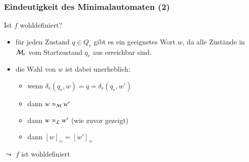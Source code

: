 \documentclass[aspectratio=1610,onlymath]{beamer}
\begin{document}
\begin{frame}[t]\frametitle{Eindeutigkeit des Minimalautomaten (2)}


%
\medskip

Ist $f$ wohldefiniert?\pause
\begin{itemize}
\item für jeden Zustand $q\in Q_r$ gibt es ein geeignetes Wort $w$, da alle Zustände in $\mathcal{M}_r$ vom
Startzustand $q_r$ aus erreichbar sind.\pause
\item die Wahl von $w$ ist dabei unerheblich: 
\begin{itemize}
\item wenn $\delta_r(q_r,w)=q=\delta_r(q_r,w')$ 
\item dann $w\simeq_{\mathcal{M}} w'$
\item dann $w\simeq_{\mathcal{L}} w'$ (wie zuvor gezeigt)
\item dann $[w]_\simeq=[w']_\simeq$
\end{itemize}
\end{itemize}
\bigskip

$\leadsto$ $f$ ist wohldefiniert

\end{frame}
\end{document}
